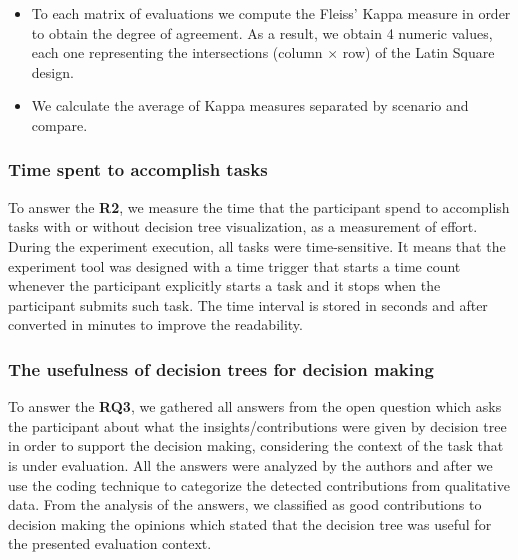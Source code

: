 \begin{itemize}
    \item To each matrix of evaluations we compute the Fleiss’ Kappa measure in order to obtain the degree of agreement. As a result, we obtain 4 numeric values, each one representing the intersections (column $\times$ row) of the Latin Square design.
    
    \item We calculate the average of Kappa measures separated by scenario and compare.
\end{itemize}



\subsubsection{Time spent to accomplish tasks}

To answer the \textbf{R2}, we measure the time that the participant spend to
accomplish tasks with or without decision tree visualization, as a measurement of effort. During the experiment execution, all tasks were time-sensitive. It means that the experiment tool was designed with a time trigger that starts a time count whenever the participant explicitly starts a task and it stops when the participant submits such task. The time interval is stored in seconds and after converted in minutes to improve the readability.

\subsubsection{The usefulness of decision trees for decision making}

To answer the \textbf{RQ3}, we gathered all answers from the open question which asks the participant about what the insights/contributions were given by decision tree in order to support the decision making, considering the context of the task that is under evaluation. All the answers were analyzed by the authors and after we use the coding technique 
\cite{seaman1999qualitative} to categorize the detected contributions from qualitative data. From the analysis of the answers, we classified as good contributions to decision making the opinions which stated that the decision tree was useful for the presented evaluation context. 


